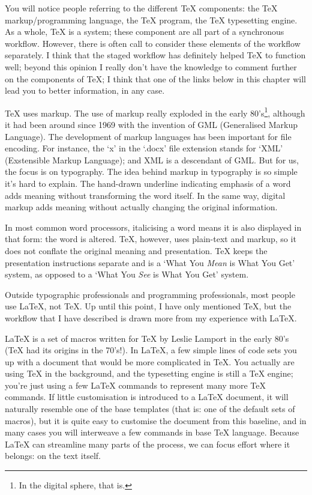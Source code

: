 \documentclass[11pt, oneside]{memoir}
\begin{document}
You will notice people referring to the different TeX components: the TeX markup/programming language, the TeX program, the TeX typesetting engine. As a whole, TeX is a system; these component are all part of a synchronous workflow. However, there is often call to consider these elements of the workflow separately. I think that the staged workflow has definitely helped TeX to function well; beyond this opinion I really don't have the knowledge to comment further on the components of TeX; I think that one of the links below in this chapter will lead you to better information, in any case.

TeX uses markup. The use of markup really exploded in the early 80's\footnote{In the digital sphere, that is.}, although it had been around since 1969 with the invention of GML (Generalised Markup Language). The development of markup languages has been important for file encoding. For instance, the `x' in the `.docx' file extension stands for `XML' (Exstensible Markup Language); and XML is a descendant of GML. But for us, the focus is on typography. The idea behind markup in typography is so simple it's hard to explain. The hand-drawn underline indicating emphasis of a word adds meaning without transforming the word itself. In the same way, digital markup adds meaning without actually changing the original information. 

In most common word processors, italicising a word means it is also displayed in that form: the word is altered. TeX, however, uses plain-text and markup, so it does not conflate the original meaning and presentation. TeX keeps the presentation instructions separate and is a `What You \emph{Mean} is What You Get' system, as opposed to a `What You \emph{See} is What You Get' system.

Outside typographic professionals and programming professionals, most people use \LaTeX{}, not \TeX{}. Up until this point, I have only mentioned TeX, but the workflow that I have described is drawn more from my experience with LaTeX.

LaTeX is a set of macros written for TeX by Leslie Lamport in the early 80's (TeX had its origins in the 70's!). In LaTeX, a few simple lines of code sets you up with a document that would be more complicated in TeX. You actually are using TeX in the background, and the typesetting engine is still a TeX engine; you're just using a few LaTeX commands to represent many more TeX commands. If little customisation is introduced to a LaTeX document, it will naturally resemble one of the base templates (that is: one of the default sets of macros), but it is quite easy to customise the document from this baseline, and in many cases you will interweave a few commands in base TeX language. Because LaTeX can streamline many parts of the process, we can focus effort where it belongs: on the text itself.
\end{document}
